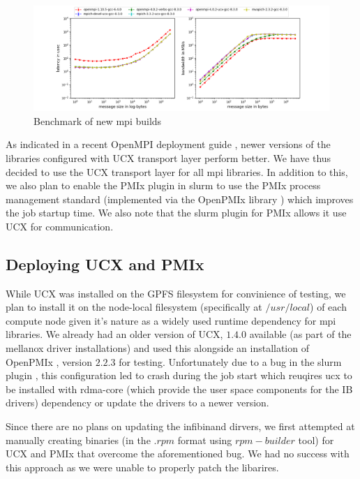 \documentclass[sigconf,authordraft]{acmart}
\begin{document}
\begin{figure}[h]
	\centering
	\includegraphics[width=\linewidth]{new_mpi}
	\caption{Benchmark of new mpi builds}
	\label{fig:newmpi}
\end{figure}

As indicated in a recent OpenMPI deployment guide \cite{openmpi_deployment_tuning}, newer versions of the libraries configured with UCX transport layer perform better. We have thus  decided to use the UCX transport layer for all mpi libraries. In addition to this, we also plan to enable the PMIx plugin \cite{slurm_pmix_sc17,slurm_pmix_2019} in slurm to use the PMIx process management standard \cite{pmix,pmix_website} (implemented via the OpenPMIx library \cite{openpmix_website}) which improves the job startup time. We also note that the slurm plugin for PMIx allows it use UCX for communication.

\subsection{Deploying UCX and PMIx}
While UCX was installed on the GPFS filesystem for convinience of testing, we plan to install it on the node-local filesystem (specifically at $/usr/local$) of each compute node given it's nature as a widely used runtime dependency for mpi libraries. We already had an older version of UCX, $1.4.0$ available (as part of the mellanox driver installations) and used this alongside an installation of OpenPMIx \cite{openpmix_website}, version $2.2.3$ for testing. Unfortunately due to a bug in the slurm plugin \cite{slurm_ucx_bug}, this configuration led to crash during the job start which reuqires ucx to be installed with rdma-core \cite{rdmacore_repository}(which provide the user space components for the IB drivers) dependency or update the drivers to a newer version.

Since there are no plans on updating the infibinand dirvers, we first attempted at manually creating binaries (in the $.rpm$ format using $rpm-builder$ tool) for UCX and PMIx that overcome the aforementioned bug. We had no success with this approach as we were unable to properly patch the libarires.
\end{document}
